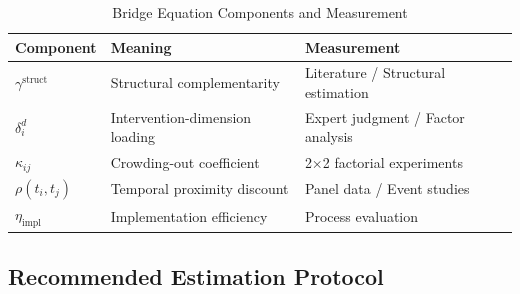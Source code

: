 \begin{table}[h]
\centering
\caption{Bridge Equation Components and Measurement}
\label{tab:bridge-measurement}
\begin{tabular}{lll}
\hline
\textbf{Component} & \textbf{Meaning} & \textbf{Measurement} \\
\hline
$\gamma^{\text{struct}}$ & Structural complementarity & Literature / Structural estimation \\
$\delta_i^d$ & Intervention-dimension loading & Expert judgment / Factor analysis \\
$\kappa_{ij}$ & Crowding-out coefficient & 2×2 factorial experiments \\
$\rho(t_i, t_j)$ & Temporal proximity discount & Panel data / Event studies \\
$\eta_{\text{impl}}$ & Implementation efficiency & Process evaluation \\
\hline
\end{tabular}
\end{table}

\subsection{Recommended Estimation Protocol}
\label{subsec:estimation-protocol}

